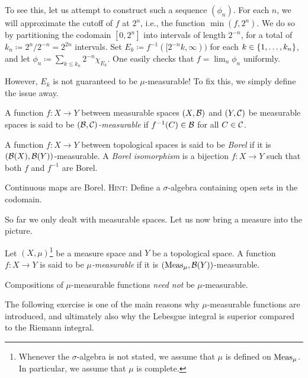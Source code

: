 \documentclass[reqno, twoside]{article}
\begin{document}
    To see this, let us attempt to construct such a sequence $(\phi_n)$. For each $n$, we will approximate the cutoff of $f$ at $2^n$, i.e., the function $\min(f,2^n)$. We do so by partitioning the codomain $[0,2^n]$ into intervals of length $2^{-n}$, for a total of $k_n\coloneqq2^n/2^{-n}=2^{2n}$ intervals. Set $E_k\coloneqq f^{-1}([2^{-n}k,\infty))$ for each $k\in\left\{1,\dots,k_n\right\}$, and let $\phi_n\coloneqq\sum_{k\leq k_n}2^{-n}\chi_{E_k}$. One easily checks that $f=\lim_n\phi_n$ uniformly.

    However, $E_k$ is not guaranteed to be $\mu$-measurable! To fix this, we simply define the issue away.

    \begin{definition}
        A function $f:X\to Y$ between measurable spaces $(X,\mathcal{B})$ and $(Y,\mathcal{C})$ be measurable spaces is said to be \textit{$(\mathcal{B},\mathcal{C})$-measurable} if $f^{-1}(C)\in\mathcal{B}$ for all $C\in\mathcal{C}$.

        A function $f:X\to Y$ between topological spaces is said to be \textit{Borel} if it is $(\mathcal{B}(X),\mathcal{B}(Y))$-measurable. A \textit{Borel isomorphism} is a bijection $f:X\to Y$ such that both $f$ and $f^{-1}$ are Borel.
    \end{definition}

    \begin{exercise}
        Continuous maps are Borel. \textsc{Hint:} Define a $\sigma$-algebra containing open sets in the codomain.
    \end{exercise}

    So far we only dealt with measurable spaces. Let us now bring a measure into the picture.

    \begin{definition}
        Let $(X,\mu)$\footnote{Whenever the $\sigma$-algebra is not stated, we assume that $\mu$ is defined on $\operatorname{Meas}_\mu$. In particular, we assume that $\mu$ is complete.} be a measure space and $Y$ be a topological space. A function $f:X\to Y$ is said to be \textit{$\mu$-measurable} if it is $(\operatorname{Meas}_\mu,\mathcal{B}(Y))$-measurable.
    \end{definition}

    \begin{remark}
        Compositions of $\mu$-measurable functions \textit{need not} be $\mu$-measurable.
    \end{remark}

    The following exercise is one of the main reasons why $\mu$-measurable functions are introduced, and ultimately also why the Lebesgue integral is superior compared to the Riemann integral.
\end{document}

